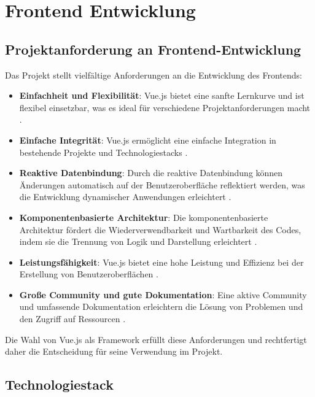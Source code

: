 \chapter{Frontend Entwicklung}
\section{Projektanforderung an Frontend-Entwicklung}

Das Projekt stellt vielfältige  Anforderungen an die Entwicklung des Frontends:

\begin{itemize}
	\item \textbf{Einfachheit und Flexibilität}:  Vue.js bietet eine sanfte Lernkurve und ist flexibel einsetzbar, was es ideal für verschiedene Projektanforderungen macht \cite{noauthor_vuejs_nodate}.
	
	\item \textbf{Einfache Integrität}: Vue.js ermöglicht eine einfache Integration in bestehende Projekte und Technologiestacks \cite{noauthor_vuejs_nodate}.
	
	\item \textbf{Reaktive Datenbindung}: Durch die reaktive Datenbindung können Änderungen automatisch auf der Benutzeroberfläche reflektiert werden, was die Entwicklung dynamischer Anwendungen erleichtert \cite{noauthor_vuejs_nodate}.
	
	\item \textbf{Komponentenbasierte Architektur}: Die komponentenbasierte Architektur fördert die Wiederverwendbarkeit und Wartbarkeit des Codes, indem sie die Trennung von Logik und Darstellung erleichtert \cite{noauthor_vuejs_nodate}.
	
	\item \textbf{Leistungsfähigkeit}: Vue.js bietet eine hohe Leistung und Effizienz bei der Erstellung von Benutzeroberflächen \cite{noauthor_vuejs_nodate}.
	
	\item \textbf{Große Community und gute Dokumentation}: Eine aktive Community und umfassende Dokumentation erleichtern die Lösung von Problemen und den Zugriff auf Ressourcen \cite{noauthor_vuejs_nodate}.
\end{itemize}

Die Wahl von Vue.js als Framework erfüllt diese Anforderungen und rechtfertigt daher die Entscheidung für seine Verwendung im Projekt.


\section{Technologiestack}


